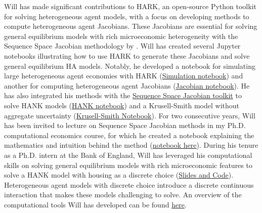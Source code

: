 \documentclass[\econtexRoot/Letter]{subfiles}
\begin{document}
\notinsubfile{\renewcommand{\econtexRoot}{.}}



Will has made significant contributions to HARK, an open-source Python toolkit for solving heterogeneous agent models, with a focus on developing methods to compute heterogeneous agent Jacobians. These Jacobians are essential for solving general equilibrium models with rich microeconomic heterogeneity with the Sequence Space Jacobian methodology by \cite{Auclert2023}. Will has created several Jupyter notebooks illustrating how to use HARK to generate these Jacobians and solve general equilibrium HA models. Notably, he developed a notebook for simulating large heterogeneous agent economies with HARK (\href{https://github.com/econ-ark/HARK/blob/master/examples/ConsNewKeynesianModel/Transition_Matrix_Example.ipynb}{Simulation notebook}) and another for computing heterogeneous agent Jacobians (\href{https://github.com/econ-ark/HARK/blob/master/examples/ConsNewKeynesianModel/Jacobian_Example.ipynb}{Jacobian notebook}). He has also integrated his methods with the \href{https://github.com/shade-econ/sequence-jacobian}{Sequence Space Jacobian toolkit} to solve HANK models (\href{https://github.com/econ-ark/HARK/blob/master/examples/ConsNewKeynesianModel/SSJ_example.ipynb}{HANK notebook}) and a Krusell-Smith model without aggregate uncertainty (\href{https://github.com/econ-ark/HARK/blob/master/examples/ConsNewKeynesianModel/KS-HARK-presentation.ipynb}{Krusell-Smith Notebook}). For two consecutive years, Will has been invited to lecture on Sequence Space Jacobian methods in my Ph.D. computational economics course, for which he created a notebook explaining the mathematics and intuition behind the method (\href{https://github.com/econ-ark/HARK/blob/master/examples/ConsNewKeynesianModel/SSJ_explanation.ipynb}{notebook here}). During his tenure as a Ph.D. intern at the Bank of England, Will has leveraged his computational skills on solving general equilibrium models with rich microeconomic features to solve a HANK model with housing as a discrete choice (\href{https://github.com/wdu9/HANK_Housing_Block}{Slides and Code}). Heterogeneous agent models with discrete choice introduce a discrete continuous interaction that makes these models challenging to solve. An overview of the computational tools Will has developed can be found \href{https://www.william-du.com/computational-tools}{here}.
\end{document}
